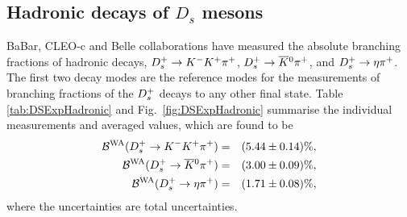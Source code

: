 \clearpage
\subsection{Hadronic decays of $D_s$ mesons}

BaBar, CLEO-c and Belle collaborations have measured the absolute branching fractions of hadronic decays, $D_{s}^+\to K^-K^+\pi^+$, $D_{s}^+\to \overline{K}{}^0\pi^+$, and $D_{s}^+ \to \eta\pi^+$. The first two 
decay modes are the reference modes for the measurements of branching fractions of the $D_{s}^+$ decays to any other final state. Table \ref{tab:DSExpHadronic} and 
Fig.~\ref{fig:DSExpHadronic} summarise the individual measurements and averaged values, which are found to be 
\begin{eqnarray}
{\cal B}^{\rm WA}(D_{s}^+\to K^-K^+\pi^+) & = & (5.44\pm0.14)\%,\\
{\cal B}^{\rm WA}(D_{s}^+\to \overline{K}{}^0\pi^+) & = & (3.00\pm0.09)\%,\\
{\cal B}^{\rm WA}(D_{s}^+\to \eta\pi^+) & = & (1.71\pm0.08)\%,
\end{eqnarray}
where the uncertainties are total uncertainties. 

